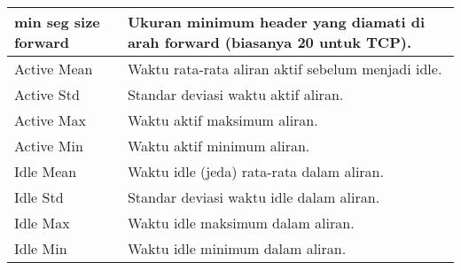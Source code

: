 \documentclass[a4paper,12pt]{report}
\begin{document}
\begin{table}[h!]
\begin{longtable}{|p{3cm} | p{10cm} |}
		\hline
		min seg size forward & Ukuran minimum header yang diamati di arah forward (biasanya 20 untuk TCP). \\
		\hline
		Active Mean & Waktu rata-rata aliran aktif sebelum menjadi idle. \\
		\hline
		Active Std & Standar deviasi waktu aktif aliran. \\
		\hline
		Active Max & Waktu aktif maksimum aliran. \\
		\hline
		Active Min & Waktu aktif minimum aliran. \\
		\hline
		Idle Mean & Waktu idle (jeda) rata-rata dalam aliran. \\
		\hline
		Idle Std & Standar deviasi waktu idle dalam aliran. \\
		\hline
		Idle Max & Waktu idle maksimum dalam aliran. \\
		\hline
		Idle Min & Waktu idle minimum dalam aliran. \\
		\hline
	\end{longtable}
\end{table}


\newpage
\end{document}
